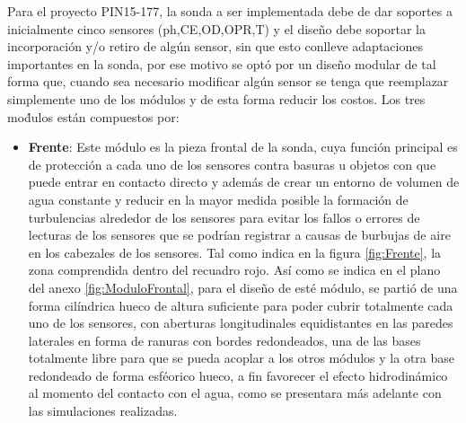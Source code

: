 Para el proyecto PIN15-177, la sonda a ser implementada debe de dar soportes a inicialmente cinco sensores (ph,CE,OD,OPR,T) y el dise\~no debe soportar la incorporaci\'on y/o retiro de alg\'un sensor, sin que esto conlleve adaptaciones importantes en la sonda, por ese motivo se opt\'o por un dise\~no modular de tal forma que, cuando sea necesario modificar alg\'un sensor se tenga que reemplazar simplemente uno de los m\'odulos y de esta forma reducir los costos. Los tres mo\'dulos est\'an compuestos por:
\begin{itemize}
    \item \textbf{Frente}: Este m\'odulo es la pieza frontal de la sonda, cuya funci\'on principal es de protecci\'on a cada uno de los sensores contra basuras u objetos con que puede entrar en contacto directo y adem\'as de crear un entorno de volumen de agua constante y reducir en la mayor medida posible la formaci\'on de turbulencias alrededor de los sensores para evitar los fallos o errores de lecturas de los sensores que se podr\'ian registrar a causas de burbujas de aire en los cabezales de los sensores. Tal como indica en la figura \ref{fig:Frente}, la zona comprendida dentro del recuadro rojo. As\'i como se indica en el plano del anexo \ref{fig:ModuloFrontal}, para el dise\~no de est\'e m\'odulo, se parti\'o de una forma cil\'indrica hueco de altura suficiente para poder cubrir totalmente cada uno de los sensores, con aberturas longitudinales equidistantes en las paredes laterales en forma de ranuras con bordes redondeados, una de las bases totalmente libre para que se pueda acoplar a los otros m\'odulos y  la otra base redondeado de forma esf\'eorico hueco, a fin favorecer el efecto hidrodin\'amico al momento del contacto con el agua, como se presentara m\'as adelante con las simulaciones realizadas.
    

\end{itemize}
